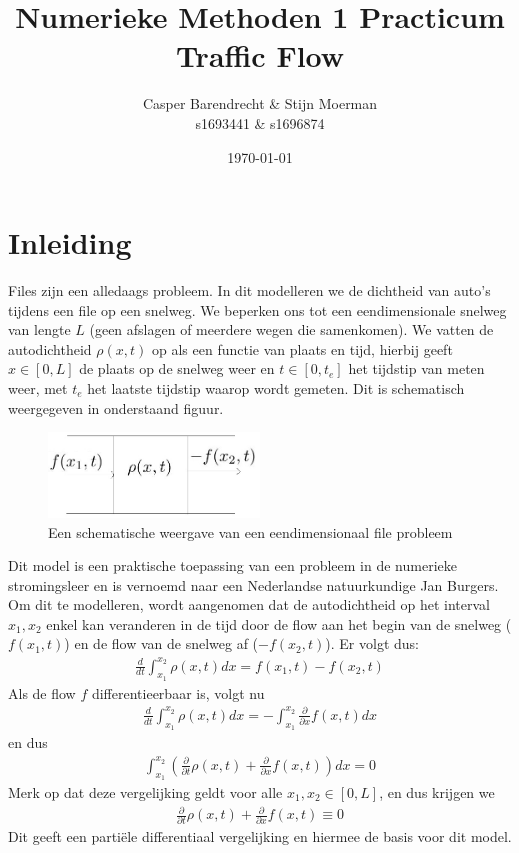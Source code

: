 \documentclass{article}
\title{Numerieke Methoden 1 Practicum Traffic Flow}
\author{Casper Barendrecht \& Stijn Moerman\\ s1693441 \& s1696874}
\date{\today}
\begin{document}
\maketitle
\newpage
\section*{Inleiding}
Files zijn een alledaags probleem. In dit modelleren we de dichtheid van auto's tijdens een file op een snelweg. We beperken ons tot een eendimensionale snelweg van lengte \(L\) (geen afslagen of meerdere wegen die samenkomen). 
We vatten de autodichtheid \(\rho(x,t)\) op als een functie van plaats en tijd, hierbij geeft \(x\in[0,L]\) de plaats op de snelweg weer en \(t\in[0,t_e]\) het tijdstip van meten weer, met \(t_e\) het laatste tijdstip waarop wordt gemeten. 
Dit is schematisch weergegeven in onderstaand figuur.

\begin{figure}[H]
  \centering
  \includegraphics[width=0.5\textwidth]{flow}
  \caption{Een schematische weergave van een eendimensionaal file probleem}
  \label{fig:file}
\end{figure}

Dit model is een praktische toepassing van een probleem in de numerieke stromingsleer en is vernoemd naar een Nederlandse natuurkundige Jan Burgers.
Om dit te modelleren, wordt aangenomen dat de autodichtheid op het interval \(x_1,x_2\) enkel kan veranderen in de tijd door de flow aan het begin van de snelweg (\(f(x_1,t)\)) en de flow van de snelweg af  (\(-f(x_2,t)\)). 
Er volgt dus:
\begin{align*}
\frac{d}{dt}\int_{x_1}^{x_2}\rho(x,t)dx=f(x_1,t)-f(x_2,t)
\end{align*}
Als de flow \(f\) differentieerbaar is, volgt nu
\begin{align*}
	\frac{d}{dt}\int_{x_1}^{x_2}\rho(x,t)dx = -\int_{x_1}^{x_2}\frac{\partial}{\partial x}f(x,t)dx
\end{align*}
en dus
\begin{align}
	\int_{x_1}^{x_2}\left(\frac{\partial}{\partial t}\rho(x,t)+\frac{\partial}{\partial x}f(x,t)\right)dx=0
\end{align}
Merk op dat deze vergelijking geldt voor alle \(x_1,x_2\in[0,L]\), en dus krijgen we 
\begin{align*}
	\frac{\partial}{\partial t}\rho(x,t)+\frac{\partial}{\partial x}f(x,t) \equiv 0
\end{align*}
Dit geeft een parti\"ele differentiaal vergelijking en hiermee de basis voor dit model.
\end{document}
